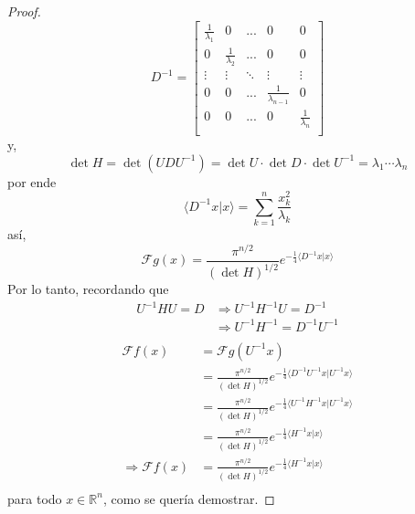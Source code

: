 \documentclass[12pt]{report}
\theoremstyle{largebreak}
\newcommand\pint[2]{\ensuremath{\langle#1| #2\rangle}}
\newcommand{\fou}[1]{\ensuremath{\mathcal{F}#1}}
\begin{document}
\begin{proof}
\begin{equation*}
            D^{-1}=\left[
                \begin{array}{ccccc}
                    \frac{1}{\lambda_1} &  0 & ... & 0 & 0\\
                    0 & \frac{1}{\lambda_2} & ... & 0 & 0\\
                    \vdots & \vdots & \ddots & \vdots & \vdots \\
                    0 & 0 & ... & \frac{1}{\lambda_{ n-1}} & 0\\
                    0 & 0 & ... & 0 & \frac{1}{\lambda_n}\\
                \end{array}
             \right]
        \end{equation*}
        y,
        \begin{equation*}
            \det H = \det (UDU^{-1})=\det U\cdot \det D\cdot\det U^{-1}=\lambda_1\cdots\lambda_n
        \end{equation*}
        por ende
        \begin{equation*}
            \pint{D^{-1}x}{x}=\sum_{k=1}^n \frac{x_k^2}{\lambda_k}
        \end{equation*}
        así,
        \begin{equation*}
            \fou{g}(x)=\frac{\pi^{ n/2}}{(\det H)^{1/2}}e^{ -\frac{1}{4}\pint{D^{-1}x}{x}}
        \end{equation*}
        Por lo tanto, recordando que
        \begin{equation*}
            \begin{split}
                U^{-1}HU=D&\Rightarrow U^{-1}H^{-1}U=D^{-1}\\
                &\Rightarrow U^{-1}H^{-1}=D^{-1}U^{-1}\\
            \end{split}
        \end{equation*}
        \begin{equation*}
            \begin{split}
                \fou{f}(x)&=\fou{g}(U^{-1}x)\\
                &=\frac{\pi^{ n/2}}{(\det H)^{1/2}}e^{ -\frac{1}{4}\pint{D^{-1}U^{-1}x}{U^{-1}x}}\\
                &=\frac{\pi^{ n/2}}{(\det H)^{1/2}}e^{ -\frac{1}{4}\pint{U^{-1}H^{-1}x}{U^{-1}x}}\\
                &=\frac{\pi^{ n/2}}{(\det H)^{1/2}}e^{ -\frac{1}{4}\pint{H^{-1}x}{x}}\\
                \Rightarrow \fou{f}(x)&=\frac{\pi^{ n/2}}{(\det H)^{1/2}}e^{ -\frac{1}{4}\pint{H^{-1}x}{x}}\\
            \end{split}
        \end{equation*}
        para todo $x\in\mathbb{R}^n$, como se quería demostrar.
    
    \end{proof}
\end{document}
